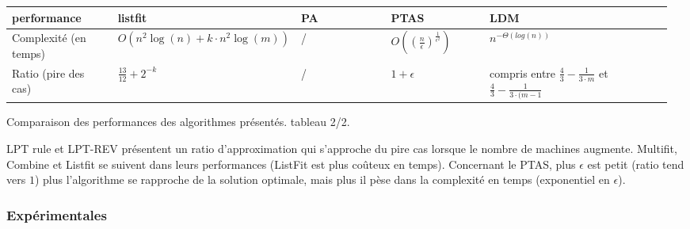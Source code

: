\documentclass[a4paper,12pt]{report}
\theoremstyle{plain}				%
\theoremstyle{definition}				%
\begin{document}
\begin{center}
\begin{tabular}{p{0.17\linewidth}
				p{0.16\linewidth}
				p{0.16\linewidth}
				p{0.16\linewidth}
				p{0.32\linewidth}}


\hline
performance 						&
							listfit &
							PA		&
							PTAS	&
							LDM
\\ \hline

Complexité \newline (en temps) &
							$O(n^2 \log(n) + k \cdot n^2 \log(m))$&	%
							/& 		%
							$ O(( \frac{n}{\epsilon})^\frac{1}{\epsilon ^ 2})$&
					 		$n^{- \Theta (log(n))}$%

\\	\hline
Ratio \newline (pire des cas)		&
							$\frac{13}{12} + 2^{-k}$&		%
							/&								%
							$1 + \epsilon$	&				%
							compris entre \newline						%
								$\frac{4}{3}-\frac{1}{3 \cdot m}$ et	%
								\newline 								%
								$\frac{4}{3}-\frac{1}{3 \cdot (m-1}$	%

\\
\hline
\end{tabular}
Comparaison des performances des algorithmes présentés. tableau 2/2.
\end{center}

LPT rule et LPT-REV présentent un ratio d'approximation qui s'approche
du pire cas lorsque le nombre de machines augmente.
Multifit, Combine et Listfit se suivent dans leurs performances
(ListFit est plus coûteux en temps).
Concernant le PTAS, plus $\epsilon$ est petit (ratio tend vers $1$)
plus l'algorithme se rapproche de la solution optimale, mais plus il
pèse dans la complexité en temps (exponentiel en $\epsilon$).


\subsubsection{Expérimentales}
\end{document}
